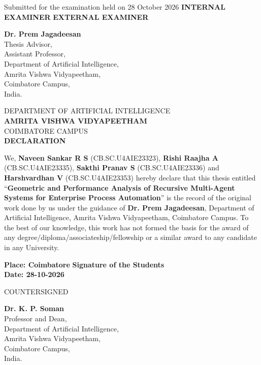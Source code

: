 \documentclass[a4paper, 12pt]{report}
\theoremstyle{definition}
\begin{document}
	\vfill
	\noindent Submitted for the examination held on 28 October 2026
	\vfill
	\noindent\textbf{INTERNAL EXAMINER} \hfill \textbf{EXTERNAL EXAMINER}
	\vfill
	\begin{center}
		\textbf{Dr. Prem Jagadeesan}\\
		Thesis Advisor,\\
		Assistant Professor,\\
		Department of Artificial Intelligence,\\
		Amrita Vishwa Vidyapeetham,\\
		Coimbatore Campus,\\
		India.
	\end{center}

	\newpage
	\begin{center}
		{\large DEPARTMENT OF ARTIFICIAL INTELLIGENCE}\\
		{\Large\textbf{AMRITA VISHWA VIDYAPEETHAM}}\\
		{\large COIMBATORE CAMPUS}\\[2.5cm]
		{\large\textbf{DECLARATION}}\\[0.3cm]
	\end{center}
	
	\noindent We, \textbf{Naveen Sankar R S} (CB.SC.U4AIE23323), \textbf{Rishi Raajha A} (CB.SC.U4AIE23335), \textbf{Sakthi Pranav S} (CB.SC.U4AIE23336) and \textbf{Harshvardhan V} (CB.SC.U4AIE23353) hereby declare that this thesis entitled \enquote{\textbf{Geometric and Performance Analysis of Recursive Multi-Agent Systems for Enterprise Process Automation}} is the record of the original work done by us under the guidance of \textbf{Dr. Prem Jagadeesan}, Department of Artificial Intelligence, Amrita Vishwa Vidyapeetham, Coimbatore Campus. To the best of our knowledge, this work has not formed the basis for the award of any degree/diploma/associateship/fellowship or a similar award to any candidate in any University.
	
	\vspace*{1cm}
	\noindent\textbf{Place: Coimbatore} \hfill \textbf{Signature of the Students} \\
	\noindent\textbf{Date: 28-10-2026}
	\vfill
	\begin{center}
		{\large COUNTERSIGNED}
	\end{center}
	\vspace{0.6in}
	
	\begin{center}
		\textbf{Dr. K. P. Soman}\\
		Professor and Dean, \\ 
		Department of Artificial Intelligence, \\
		Amrita Vishwa Vidyapeetham,\\
		Coimbatore Campus,\\
		India.
	\end{center}
	
\end{document}
